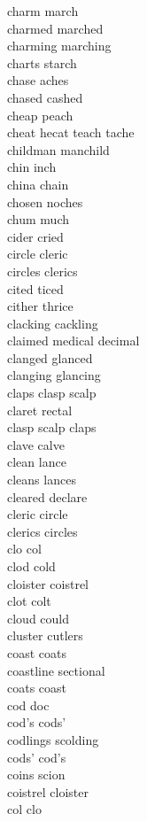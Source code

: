 charm march\\
charmed marched\\
charming marching\\
charts starch\\
chase aches\\
chased cashed\\
cheap peach\\
cheat hecat teach tache\\
childman manchild\\
chin inch\\
china chain\\
chosen noches\\
chum much\\
cider cried\\
circle cleric\\
circles clerics\\
cited ticed\\
cither thrice\\
clacking cackling\\
claimed medical decimal\\
clanged glanced\\
clanging glancing\\
claps clasp scalp\\
claret rectal\\
clasp scalp claps\\
clave calve\\
clean lance\\
cleans lances\\
cleared declare\\
cleric circle\\
clerics circles\\
clo col\\
clod cold\\
cloister coistrel\\
clot colt\\
cloud could\\
cluster cutlers\\
coast coats\\
coastline sectional\\
coats coast\\
cod doc\\
cod's cods'\\
codlings scolding\\
cods' cod's\\
coins scion\\
coistrel cloister\\
col clo\\
